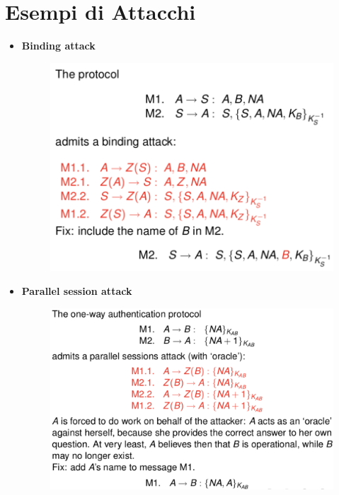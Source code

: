 \documentclass[11pt, a4paper, twoside, italian]{report}
\theoremstyle{plain}
\begin{document}
\section*{Esempi di Attacchi}
\begin{multicols}{2}
\begin{itemize}
	\item \textbf{Binding attack}
	\begin{figure}[H]
		\centering
		\includegraphics[scale=0.48]{bindingattack}
	\end{figure}
\end{itemize}
\columnbreak
\begin{itemize}
	\item \textbf{Parallel session attack}
	\begin{figure}[H]
		\centering
		\includegraphics[scale=0.48]{parallelsession}
	\end{figure}
\end{itemize}
\end{multicols}
\end{document}
